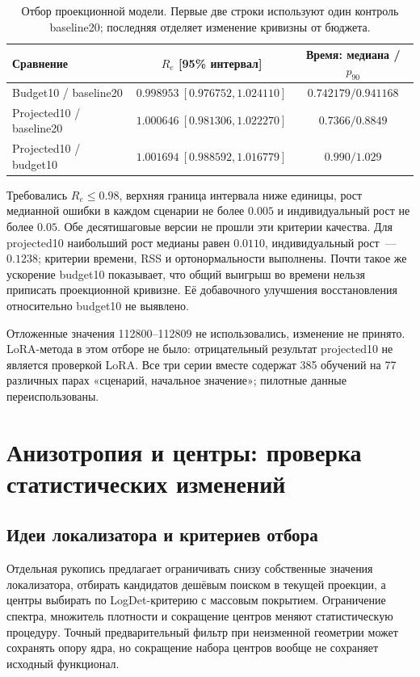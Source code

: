 \documentclass[11pt,a4paper]{article}
\numberwithin{equation}{section}
\begin{document}
\begin{table}[htbp]
\centering\small
\caption{Отбор проекционной модели. Первые две строки используют
один контроль baseline20; последняя отделяет изменение кривизны от бюджета.}
\label{tab:projected}
\begin{tabularx}{\linewidth}{@{}Xcc@{}}
\toprule
Сравнение & $R_e$ [95\% интервал] & Время: медиана / $p_{90}$\\
\midrule
Budget10 / baseline20 & $0.998953\ [0.976752,1.024110]$ & $0.742179/0.941168$\\
Projected10 / baseline20 & $1.000646\ [0.981306,1.022270]$ & $0.7366/0.8849$\\
Projected10 / budget10 & $1.001694\ [0.988592,1.016779]$ & $0.990/1.029$\\
\bottomrule
\end{tabularx}
\end{table}

Требовались $R_e\le0.98$, верхняя граница интервала ниже единицы,
рост медианной ошибки в каждом сценарии не более $0.005$
и индивидуальный рост не более $0.05$.
Обе десятишаговые версии не прошли эти критерии качества.
Для projected10 наибольший рост медианы равен $0.0110$,
индивидуальный рост~--- $0.1238$; критерии времени, RSS
и ортонормальности выполнены.
Почти такое же ускорение budget10 показывает, что общий выигрыш
во времени нельзя приписать проекционной кривизне.
Её добавочного улучшения восстановления относительно budget10 не выявлено.

Отложенные значения 112800--112809 не использовались,
изменение не принято. LoRA-метода в этом отборе не было:
отрицательный результат projected10 не является проверкой LoRA.
Все три серии вместе содержат 385 обучений на 77 различных
парах «сценарий, начальное значение»; пилотные данные переиспользованы.
\cite{lowrank}

\section{Анизотропия и центры: проверка статистических изменений}
\label{sec:centers}

\subsection{Идеи локализатора и критериев отбора}

Отдельная рукопись предлагает ограничивать снизу собственные значения
локализатора, отбирать кандидатов дешёвым поиском в текущей проекции,
а центры выбирать по LogDet-критерию с массовым покрытием.
Ограничение спектра, множитель плотности и сокращение центров
меняют статистическую процедуру. Точный предварительный фильтр
при неизменной геометрии может сохранять опору ядра, но сокращение
набора центров вообще не сохраняет исходный функционал.
\end{document}
